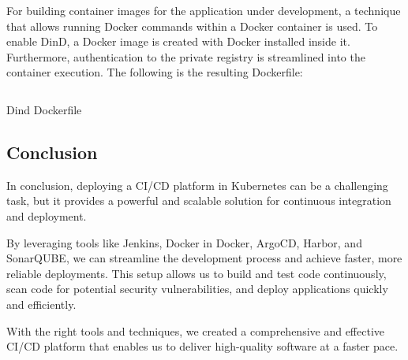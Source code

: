 
For building container images for the application under development, a technique that allows running Docker commands within a Docker container is used. To enable DinD, a Docker image is created with Docker installed inside it. Furthermore, authentication to the private registry is streamlined into the container execution. The following is the resulting Dockerfile: 

\begin{listing}[H]
    \inputminted{Dockerfile}{codeListing/dind-Dockerfile}
    \caption{Dind Dockerfile}
    \label{lst:Dind Dockerfile}
\end{listing}

\subsection*{Conclusion}
In conclusion, deploying a CI/CD platform in Kubernetes can be a challenging task, but it provides a powerful and scalable solution for continuous integration and deployment. 

By leveraging tools like Jenkins, Docker in Docker, ArgoCD, Harbor, and SonarQUBE, we can streamline the development process and achieve faster, more reliable deployments. This setup allows us to build and test code continuously, scan code for potential security vulnerabilities, and deploy applications quickly and efficiently. 

With the right tools and techniques, we created a comprehensive and effective CI/CD platform that enables us to deliver high-quality software at a faster pace.